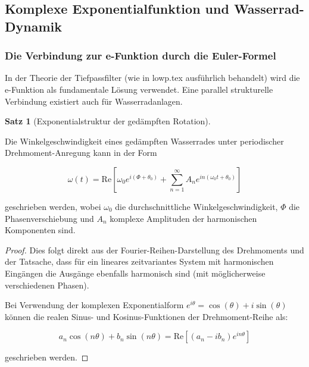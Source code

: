 \documentclass[a4paper,12pt]{article}
\theoremstyle{definition}
\newtheorem{satz}{Satz}
\begin{document}
\subsection{Komplexe Exponentialfunktion und Wasserrad-Dynamik}

\subsubsection{Die Verbindung zur e-Funktion durch die Euler-Formel}

In der Theorie der Tiefpassfilter (wie in lowp.tex ausführlich behandelt) wird die e-Funktion als fundamentale Lösung verwendet. Eine parallel strukturelle Verbindung existiert auch für Wasserradanlagen.

\begin{satz}[Exponentialstruktur der gedämpften Rotation]
  \label{satz:exp_struktur_rotation}
  
  Die Winkelgeschwindigkeit eines gedämpften Wasserrades unter periodischer Drehmoment-Anregung kann in der Form
  
  \begin{equation}
    \omega(t) = \text{Re}\left[\omega_0 e^{i(\Phi + \theta_0)} + \sum_{n=1}^{\infty} A_n e^{i n (\omega_0 t + \theta_0)}\right]
    \label{eq:omega_exponentialform}
  \end{equation}
  
  geschrieben werden, wobei $\omega_0$ die durchschnittliche Winkelgeschwindigkeit, $\Phi$ die Phasenverschiebung und $A_n$ komplexe Amplituden der harmonischen Komponenten sind.
\end{satz}

\begin{proof}
  Dies folgt direkt aus der Fourier-Reihen-Darstellung des Drehmoments und der Tatsache, dass für ein lineares zeitvariantes System mit harmonischen Eingängen die Ausgänge ebenfalls harmonisch sind (mit möglicherweise verschiedenen Phasen).
  
  Bei Verwendung der komplexen Exponentialform $e^{i\theta} = \cos(\theta) + i\sin(\theta)$ können die realen Sinus- und Kosinus-Funktionen der Drehmoment-Reihe als:
  
  \begin{equation}
    a_n \cos(n\theta) + b_n \sin(n\theta) = \text{Re}[(a_n - ib_n)e^{in\theta}]
  \end{equation}
  
  geschrieben werden.
\end{proof}
\end{document}
